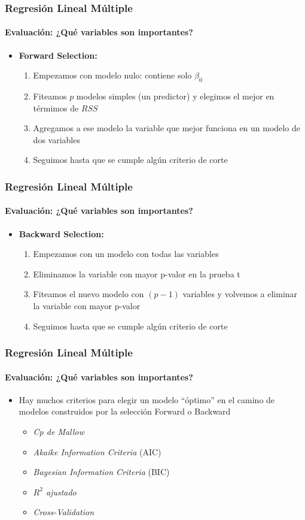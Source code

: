 \documentclass{beamer}
\begin{document}
\begin{frame}
	\frametitle{Regresión Lineal Múltiple}
	\framesubtitle{Evaluación: ¿Qué variables son importantes?}
	\begin{itemize}
		\item{\textbf{Forward Selection:}}
		\begin{enumerate}
			\item{Empezamos con modelo nulo: contiene solo $\beta_{0}$}
			\item{Fiteamos $p$ modelos simples (un predictor) y elegimos el mejor en térmimos de $RSS$}
			\item{Agregamos a ese modelo la variable que mejor funciona en un modelo de dos variables}
			\item{Seguimos hasta que se cumple algún criterio de corte}
		\end{enumerate}
	\end{itemize}
\end{frame}

\begin{frame}
	\frametitle{Regresión Lineal Múltiple}
	\framesubtitle{Evaluación: ¿Qué variables son importantes?}
	\begin{itemize}
		\item{\textbf{Backward Selection:}}
		\begin{enumerate}
			\item{Empezamos con un modelo con todas las variables}
			\item{Eliminamos la variable con mayor p-valor en la prueba t}
			\item{Fiteamos el nuevo modelo con $(p-1)$ variables y volvemos a eliminar la variable con mayor p-valor}
			\item{Seguimos hasta que se cumple algún criterio de corte}
		\end{enumerate}
	\end{itemize}
\end{frame}

\begin{frame}
	\frametitle{Regresión Lineal Múltiple}
	\framesubtitle{Evaluación: ¿Qué variables son importantes?}
	\begin{itemize}
		\item{Hay muchos criterios para elegir un modelo ``óptimo'' en el camino de modelos construidos por la selección Forward o Backward}
		\begin{itemize}
			\item{\emph{Cp de Mallow}}
			\item{\emph{Akaike Information Criteria} (AIC)}
			\item{\emph{Bayesian Information Criteria} (BIC)}
			\item{\emph{$R^2$ ajustado}}
			\item{\emph{Cross-Validation}}
		\end{itemize}
	\end{itemize}
\end{frame}
\end{document}
